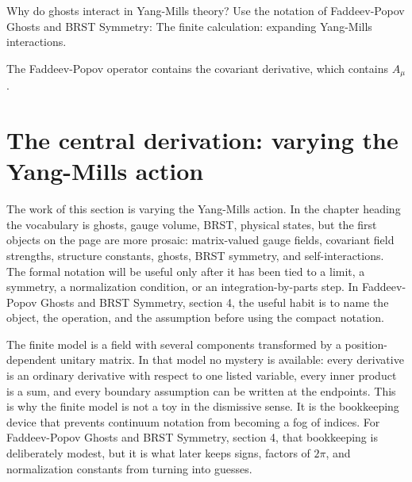\begin{exercise}
Why do ghosts interact in Yang-Mills theory?  Use the notation of Faddeev-Popov Ghosts and BRST Symmetry: The finite calculation: expanding Yang-Mills interactions.
\begin{answer}
The Faddeev-Popov operator contains the covariant derivative, which contains \(A_\mu\).
\end{answer}
\end{exercise}



\section{The central derivation: varying the Yang-Mills action}













The work of this section is varying the Yang-Mills action.  In the chapter heading the vocabulary is ghosts, gauge volume, BRST, physical states, but the first objects on the page are more prosaic: matrix-valued gauge fields, covariant field strengths, structure constants, ghosts, BRST symmetry, and self-interactions.  The formal notation will be useful only after it has been tied to a limit, a symmetry, a normalization condition, or an integration-by-parts step.  In Faddeev-Popov Ghosts and BRST Symmetry, section 4, the useful habit is to name the object, the operation, and the assumption before using the compact notation.

The finite model is a field with several components transformed by a position-dependent unitary matrix.  In that model no mystery is available: every derivative is an ordinary derivative with respect to one listed variable, every inner product is a sum, and every boundary assumption can be written at the endpoints.  This is why the finite model is not a toy in the dismissive sense.  It is the bookkeeping device that prevents continuum notation from becoming a fog of indices.  For Faddeev-Popov Ghosts and BRST Symmetry, section 4, that bookkeeping is deliberately modest, but it is what later keeps signs, factors of \(2\pi\), and normalization constants from turning into guesses.

